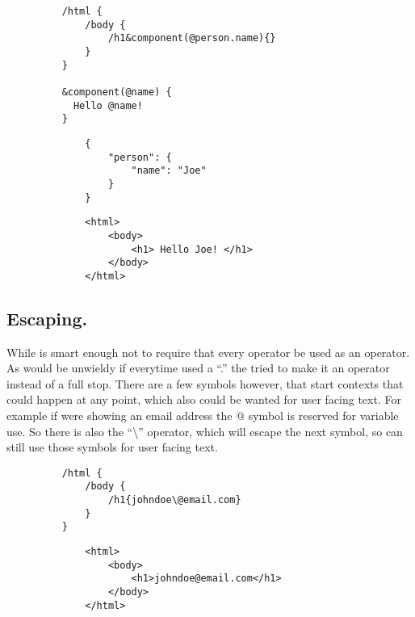 \begin{figure}[!htbp]
    \Large{\textbf{\languageName{}}}\normalsize{}
  \begin{verbatim}
    /html {
        /body {
            /h1&component(@person.name){}
        }
    }

    &component(@name) {
      Hello @name!
    }
  \end{verbatim}

    \Large{\textbf{}}\normalsize{}
    \begin{verbatim}
        {
            "person": {
                "name": "Joe"
            }
        }
    \end{verbatim}

    \Large{\textbf{}}\normalsize{}
    \begin{verbatim}
        <html>
            <body>
                <h1> Hello Joe! </h1>
            </body>
        </html>
    \end{verbatim}
\end{figure}
\newpage
\subsection{Escaping.}
While \languageName{} is smart enough not to require that every operator be used as an operator. As \languageName{} would be unwieldy if everytime \you{} used a ``.'' the \compiler{} tried to make it an operator instead of a full stop. There are a few symbols however, that start contexts that could happen at any point, which also could be wanted for user facing text. For example if \you{} were showing an email address the @ symbol is reserved for variable use. So there is also the ``\textbackslash{}'' operator, which will escape the next symbol, so \you{} can still use those symbols for user facing text.
\begin{figure}[!htbp]
    \Large{\textbf{\languageName{}}}\normalsize{}
  \begin{verbatim}
    /html {
        /body {
            /h1{johndoe\@email.com}
        }
    }
  \end{verbatim}

    \Large{\textbf{}}\normalsize{}
    \begin{verbatim}
        <html>
            <body>
                <h1>johndoe@email.com</h1>
            </body>
        </html>
    \end{verbatim}
\end{figure}
\newpage
